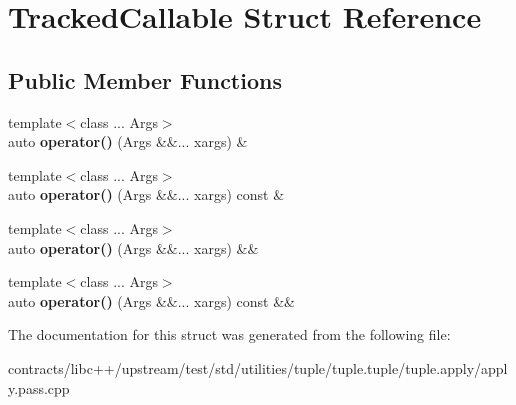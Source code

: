 \hypertarget{struct_tracked_callable}{}\section{Tracked\+Callable Struct Reference}
\label{struct_tracked_callable}
\subsection*{Public Member Functions}
\begin{DoxyCompactItemize}
\item 
\mbox{\label{struct_tracked_callable_ac0020ba34f7c4e34b3f54fd1fc41b6c5}} 
{\footnotesize template$<$class ... Args$>$ }\\auto {\bfseries operator()} (Args \&\&... xargs) \&
\item 
\mbox{\label{struct_tracked_callable_a4ac6f5a7faf6c448041cfb4cfea473be}} 
{\footnotesize template$<$class ... Args$>$ }\\auto {\bfseries operator()} (Args \&\&... xargs) const \&
\item 
\mbox{\label{struct_tracked_callable_a79959dc3efbcd96d970fe9ea676bad83}} 
{\footnotesize template$<$class ... Args$>$ }\\auto {\bfseries operator()} (Args \&\&... xargs) \&\&
\item 
\mbox{\label{struct_tracked_callable_a1f60f395426b4140915e3e86179cc874}} 
{\footnotesize template$<$class ... Args$>$ }\\auto {\bfseries operator()} (Args \&\&... xargs) const \&\&
\end{DoxyCompactItemize}


The documentation for this struct was generated from the following file\+:\begin{DoxyCompactItemize}
\item 
contracts/libc++/upstream/test/std/utilities/tuple/tuple.\+tuple/tuple.\+apply/apply.\+pass.\+cpp\end{DoxyCompactItemize}
